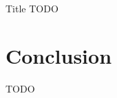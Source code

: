 \documentclass[]{beamer} %
\begin{document}
\begin{frame}{Title}
	TODO
\end{frame}



\section[Conclusion]{Conclusion}


\begin{frame}[fragile]{TODO}
\end{frame}






\end{document}

